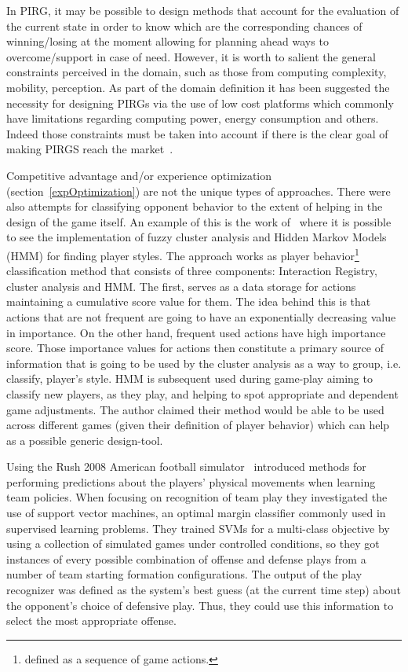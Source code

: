 In PIRG, it may be possible to design methods that account for the evaluation of the current state in order to know which are the corresponding chances of winning/losing at the moment allowing for planning ahead ways to overcome/support in case of need. However, it is worth to salient the general constraints perceived in the domain, such as those from computing complexity, mobility, perception. As part of the domain definition it has been suggested the necessity for designing PIRGs via the use of low cost platforms which commonly have limitations regarding computing power, energy consumption and others. Indeed those constraints must be taken into account if there is the clear goal of making PIRGS reach the market~\cite{martinoia_physically_2013}.

Competitive advantage and/or experience optimization (section~\ref{expOptimization}) are not the unique types of approaches. There were also attempts for classifying opponent behavior to the extent of helping in the design of the game itself. An example of this is the work of~\cite{etheredge_generic_2013} where it is possible to see the implementation of fuzzy cluster analysis and Hidden Markov Models (HMM) for finding player styles. The approach works as  player behavior\footnote{defined as a sequence of game actions.} classification method that consists of three components: Interaction Registry, cluster analysis and HMM. The first, serves as a data storage for actions maintaining a cumulative score value for them. The idea behind this is that actions that are not frequent are going to have an exponentially decreasing value in importance. On the other hand, frequent used actions have high importance score. Those importance values for actions then constitute a primary source of information that is going to be used by the cluster analysis as a way to group, i.e. classify, player's style. HMM is subsequent used during game-play aiming to classify new players, as they play, and helping to spot appropriate and dependent game adjustments. The author claimed their method would be able to be used across different games (given their definition of player behavior) which can help as a possible generic design-tool.

Using the Rush 2008 American football simulator~\cite{laviersa_using_2014} introduced methods for performing predictions about the players' physical movements when learning team policies. When focusing on recognition of team play they investigated the use of support vector machines, an optimal margin classifier commonly used in supervised learning problems. They trained SVMs for a multi-class objective by using a collection of simulated games under controlled conditions, so they got instances of every possible combination of offense and defense plays from a number of team starting formation configurations. The output of the play recognizer was defined as the system's best guess (at the current time step) about the opponent's choice of defensive play. Thus, they could use this information to select the most appropriate offense.

